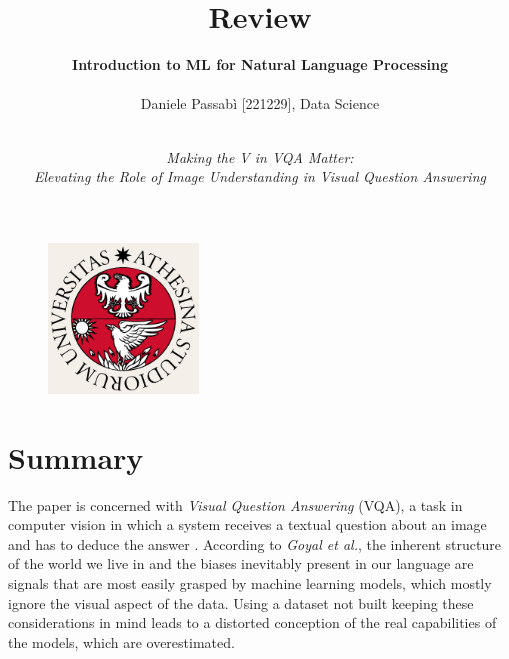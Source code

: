 \documentclass[letterpaper,11pt]{article}
\begin{document}
\pagecolor{ivory}

\title{\textbf{Review}}
\author{\textbf{Introduction to ML for Natural Language Processing}\\ \\ Daniele Passabì [221229], Data Science\\}

\date{\textit{\\Making the V in VQA Matter:\\Elevating the Role of Image Understanding in Visual Question Answering}}
\maketitle
\thispagestyle{empty}

\begin{figure}[H] 
  \centering
  \includegraphics[width=4cm]{logo.png}
\end{figure}


\newpage
\clearpage
\pagecolor{white}




\section{Summary}

The paper \cite{goyal2017making} is concerned with \textit{Visual Question Answering} (VQA), a task in computer vision in which a system receives a textual question about an image and has to deduce the answer \cite{kafle2017visual}. According to \textit{Goyal et al.}, the inherent structure of the world we live in and the biases inevitably present in our language are signals that are most easily grasped by machine learning models, which mostly ignore the visual aspect of the data. Using a dataset not built keeping these considerations in mind leads to a distorted conception of the real capabilities of the models, which are overestimated.
\end{document}

